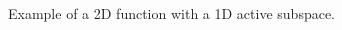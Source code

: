 \begin{figure}[htbp]
  \begin{subfigmatrix}{2}
  \end{subfigmatrix}
  \caption{Example of a 2D function with a 1D active subspace.}
\label{fig:activesubspace}
\end{figure}

